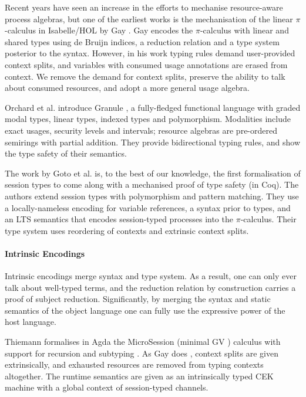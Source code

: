 \documentclass[sigplan,10pt,anonymous,review]{acmart}
\theoremstyle{definition}
\newcommand{\picalc}{$\pi$-calculus}
\begin{document}
Recent years have seen an increase in the efforts to mechanise resource-aware process algebras, but one of the earliest works is the mechanisation of the linear \picalc{} in Isabelle/HOL by Gay \cite{Gay2001}.
Gay encodes the \picalc{} with linear and shared types using de Bruijn indices, a reduction relation and a type system posterior to the syntax.
However, in his work typing rules demand user-provided context splits, and variables with consumed usage annotations are erased from context.
We remove the demand for context splits, preserve the ability to talk about consumed resources, and adopt a more general usage algebra.

Orchard et al. introduce Granule \cite{Orchard}, a fully-fledged functional language with graded modal types, linear types, indexed types and polymorphism.
Modalities include exact usages, security levels and intervals; resource algebras are pre-ordered semirings with partial addition.
They provide bidirectional typing rules, and show the type safety of their semantics.

The work by Goto et al. \cite{Goto2016a} is, to the best of our knowledge, the first formalisation of session types to come along with a mechanised proof of type safety (in Coq).
The authors extend session types with polymorphism and pattern matching.
They use a locally-nameless encoding for variable references, a syntax prior to types, and an LTS semantics that encodes session-typed processes into the \picalc{}.
Their type system uses reordering of contexts and extrinsic context splits. 

\paragraph{Intrinsic Encodings}
 
Intrinsic encodings merge syntax and type system.
As a result, one can only ever talk about well-typed terms, and the reduction relation by construction carries a proof of subject reduction.
Significantly, by merging the syntax and static semantics of the object language one can fully use the expressive power of the host language.

Thiemann formalises in Agda the MicroSession (minimal GV \cite{Gay2010}) calculus with support for recursion and subtyping \cite{Thiemann2019}.
As Gay does \cite{Gay2001}, context splits are given extrinsically, and exhausted resources are removed from typing contexts altogether.
The runtime semantics are given as an intrinsically typed CEK machine with a global context of session-typed channels.
\end{document}
